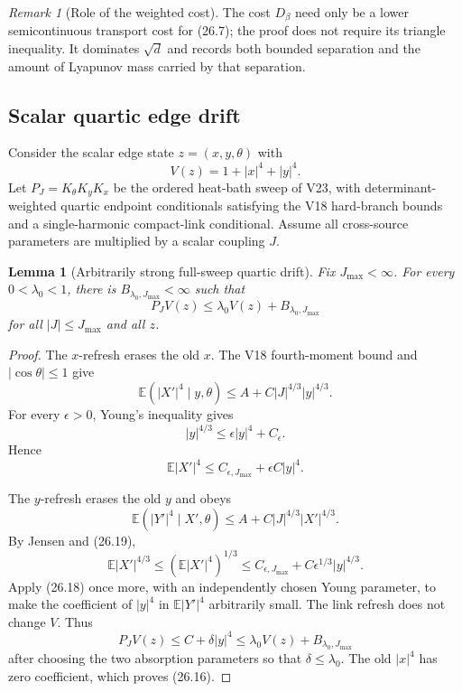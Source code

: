 \documentclass[11pt]{article}
\newtheorem{lemma}[theorem]{Lemma}
\theoremstyle{remark}
\newtheorem{remark}[theorem]{Remark}
\begin{document}
\begin{remark}[Role of the weighted cost]
\label{rem:v15v26-role}
The cost \(D_\beta\) need only be a lower semicontinuous transport
cost for (26.7); the proof does not require its triangle inequality.
It dominates \(\sqrt d\) and records both bounded separation and
the amount of Lyapunov mass carried by that separation.
\end{remark}

\subsection{Scalar quartic edge drift}

Consider the scalar edge state \(z=(x,y,\theta)\) with
\[
 V(z)=1+|x|^4+|y|^4.                                       \tag{26.15}
\]
Let \(P_J=K_\theta K_yK_x\) be the ordered heat-bath sweep of V23,
with determinant-weighted quartic endpoint conditionals satisfying
the V18 hard-branch bounds and a single-harmonic compact-link
conditional.  Assume all cross-source parameters are multiplied by
a scalar coupling \(J\).

\begin{lemma}[Arbitrarily strong full-sweep quartic drift]
\label{lem:v15v26-edge-drift}
Fix \(J_{\max}<\infty\).  For every \(0<\lambda_0<1\), there is
\(B_{\lambda_0,J_{\max}}<\infty\) such that
\[
 \boxed{
 P_JV(z)
 \le\lambda_0V(z)+B_{\lambda_0,J_{\max}}}                  \tag{26.16}
\]
for all \(|J|\le J_{\max}\) and all \(z\).
\end{lemma}

\begin{proof}
The \(x\)-refresh erases the old \(x\).  The V18 fourth-moment
bound and \(|\cos\theta|\le1\) give
\[
 \mathbb E(|X'|^4\mid y,\theta)
 \le A+C|J|^{4/3}|y|^{4/3}.                                \tag{26.17}
\]
For every \(\epsilon>0\), Young's inequality gives
\[
 |y|^{4/3}\le\epsilon|y|^4+C_\epsilon.                     \tag{26.18}
\]
Hence
\[
 \mathbb E|X'|^4
 \le C_{\epsilon,J_{\max}}+\epsilon C|y|^4.                \tag{26.19}
\]

The \(y\)-refresh erases the old \(y\) and obeys
\[
 \mathbb E(|Y'|^4\mid X',\theta)
 \le A+C|J|^{4/3}|X'|^{4/3}.                               \tag{26.20}
\]
By Jensen and (26.19),
\[
 \mathbb E|X'|^{4/3}
 \le(\mathbb E|X'|^4)^{1/3}
 \le C_{\epsilon,J_{\max}}
      +C\epsilon^{1/3}|y|^{4/3}.                           \tag{26.21}
\]
Apply (26.18) once more, with an independently chosen Young
parameter, to make the coefficient of \(|y|^4\) in
\(\mathbb E|Y'|^4\) arbitrarily small.  The link refresh does not
change \(V\).  Thus
\[
 P_JV(z)\le C+\delta|y|^4
 \le\lambda_0V(z)+B_{\lambda_0,J_{\max}}
\]
after choosing the two absorption parameters so that
\(\delta\le\lambda_0\).  The old \(|x|^4\) has zero coefficient,
which proves (26.16).
\end{proof}
\end{document}
